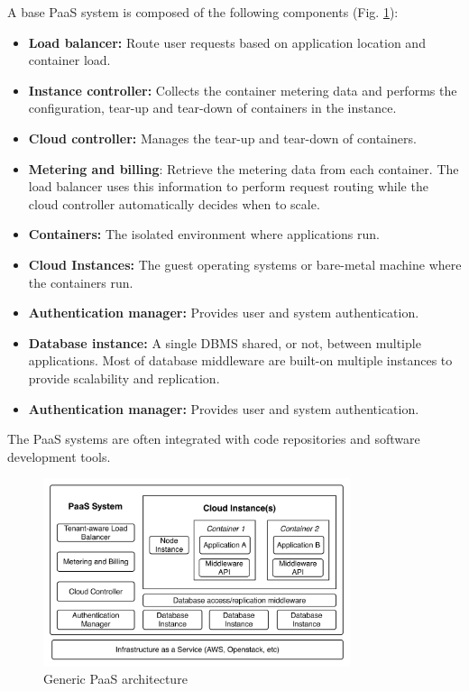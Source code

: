 A base PaaS system is composed of the following components (Fig. \ref{paasArchitecture}):
\begin{itemize}
  \item \textbf{Load balancer:} Route user requests based on application location and container load.
  \item \textbf{Instance controller:} Collects the container metering data and performs the configuration, tear-up and tear-down of containers in the instance.
  \item \textbf{Cloud controller:} Manages the tear-up and tear-down of containers.
  \item \textbf{Metering and billing}: Retrieve the metering data from each container. The load balancer uses this information to perform request routing while the cloud controller automatically decides when to scale.
  \item \textbf{Containers:} The isolated environment where applications run.
  \item \textbf{Cloud Instances:} The guest operating systems or bare-metal machine where the containers run.
  \item \textbf{Authentication manager:} Provides user and system authentication.
  \item \textbf{Database instance:} A single DBMS shared, or not, between multiple applications. Most of database middleware are built-on multiple instances to provide scalability and replication.
  \item \textbf{Authentication manager:} Provides user and system authentication.
\end{itemize}
The PaaS systems are often integrated with code repositories and software development tools.

\begin{figure}
  \centering
  \includegraphics[width=90mm]{images/paas}
  \caption{Generic PaaS architecture}
  \label{paasArchitecture}
\end{figure}


